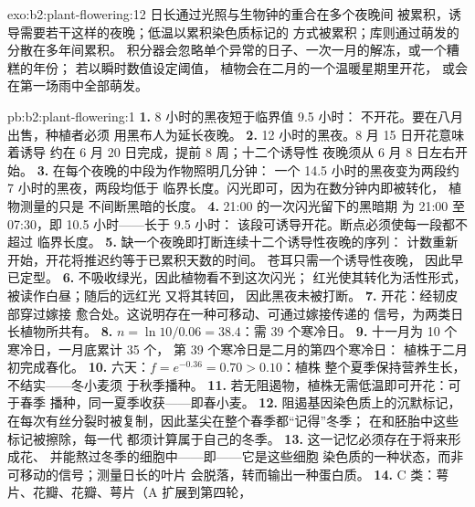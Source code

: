 \begin{solution}{exo:b2:plant-flowering:12}
日长通过光照与生物钟的重合在多个夜晚间
被累积，诱导需要若干这样的夜晚；低温以累积染色质标记的
方式被累积；库则通过萌发的分散在多年间累积。
积分器会忽略单个异常的日子、一次一月的解冻，或一个糟糕的年份；
若以瞬时数值设定阈值，
植物会在二月的一个温暖星期里开花，
或会在第一场雨中全部萌发。
\end{solution}

\begin{solution}{pb:b2:plant-flowering:1}
\textbf{1.} 8 小时的黑夜短于临界值 9.5 小时：
不开花。要在八月出售，种植者必须
用黑布人为延长夜晚。
\textbf{2.} 12 小时的黑夜。8 月 15 日开花意味着诱导
约在 6 月 20 日完成，提前 8 周；十二个诱导性
夜晚须从 6 月 8 日左右开始。
\textbf{3.} 在每个夜晚的中段为作物照明几分钟：
一个 14.5 小时的黑夜变为两段约 7 小时的黑夜，两段均低于
临界长度。闪光即可，因为在数分钟内即被转化，
植物测量的只是
不间断黑暗的长度。
\textbf{4.} 21:00 的一次闪光留下的黑暗期
为 21:00 至 07:30，即 10.5 小时——长于 9.5 小时：
该段可诱导开花。断点必须使每一段都不超过
临界长度。
\textbf{5.} 缺一个夜晚即打断连续十二个诱导性夜晚的序列：
计数重新开始，开花将推迟约等于已累积天数的时间。
苍耳只需一个诱导性夜晚，
因此早已定型。
\textbf{6.} 不吸收绿光，因此植物看不到这次闪光；
红光使其转化为活性形式，被读作白昼；随后的远红光
又将其转回，
因此黑夜未被打断。
\textbf{7.} 开花：经韧皮部穿过嫁接
愈合处。这说明存在一种可移动、可通过嫁接传递的
信号，为两类日长植物所共有。
\textbf{8.} $n = \ln 10/0.06 = 38.4$：需 39 个寒冷日。
\textbf{9.} 十一月为 10 个寒冷日，一月底累计 35 个，
第 39 个寒冷日是二月的第四个寒冷日：
植株于二月初完成春化。
\textbf{10.} 六天：$f = e^{-0.36} = 0.70 > 0.10$：植株
整个夏季保持营养生长，不结实——冬小麦须
于秋季播种。
\textbf{11.} 若无阻遏物，植株无需低温即可开花：可于春季
播种，同一夏季收获——即春小麦。
\textbf{12.} 阻遏基因染色质上的沉默标记，
在每次有丝分裂时被复制，因此茎尖在整个春季都“记得”冬季；
在和胚胎中这些标记被擦除，每一代
都须计算属于自己的冬季。
\textbf{13.} 这一记忆必须存在于将来形成花、
并能熬过冬季的细胞中——即——它是这些细胞
染色质的一种状态，而非可移动的信号；测量日长的叶片
会脱落，转而输出一种蛋白质。
\textbf{14.} C 类：萼片、花瓣、花瓣、萼片（A 扩展到第四轮，

\end{solution}
